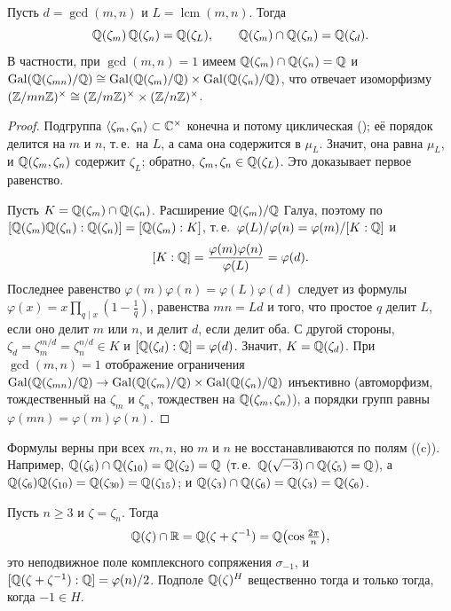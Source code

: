 \begin{proposition}
Пусть $d=\gcd(m,n)$ и $L=\operatorname{lcm}(m,n)$. Тогда
\[
\mathbb Q(\zeta_m)\,\mathbb Q(\zeta_n)=\mathbb Q(\zeta_L),\qquad \mathbb Q(\zeta_m)\cap\mathbb Q(\zeta_n)=\mathbb Q(\zeta_d).
\]
В частности, при $\gcd(m,n)=1$ имеем $\mathbb Q(\zeta_m)\cap\mathbb Q(\zeta_n)=\mathbb Q$ и $\operatorname{Gal}(\mathbb Q(\zeta_{mn})/\mathbb Q)\cong
\operatorname{Gal}(\mathbb Q(\zeta_m)/\mathbb Q)\times\operatorname{Gal}(\mathbb Q(\zeta_n)/\mathbb Q)$, что отвечает изоморфизму $(\mathbb Z/mn\mathbb Z)^\times\cong(\mathbb Z/m\mathbb Z)^\times\times(\mathbb Z/n\mathbb Z)^\times$.
\end{proposition}

\begin{proof}
Подгруппа $\langle\zeta_m,\zeta_n\rangle\subset\mathbb C^\times$ конечна и потому циклическая (); её порядок делится на $m$ и
$n$, т.\,е.\ на $L$, а сама она содержится в $\mu_L$. Значит, она равна $\mu_L$, и $\mathbb Q(\zeta_m,\zeta_n)$ содержит $\zeta_L$; обратно,
$\zeta_m,\zeta_n\in\mathbb Q(\zeta_L)$. Это доказывает первое равенство.

Пусть $K=\mathbb Q(\zeta_m)\cap\mathbb Q(\zeta_n)$. Расширение $\mathbb Q(\zeta_m)/\mathbb Q$ Галуа, поэтому по 
$[\mathbb Q(\zeta_m)\mathbb Q(\zeta_n):\mathbb Q(\zeta_n)]=[\mathbb Q(\zeta_m):K]$, т.\,е.\ $\varphi(L)/\varphi(n)=\varphi(m)/[K:\mathbb Q]$ и
\[
[K:\mathbb Q]=\frac{\varphi(m)\varphi(n)}{\varphi(L)}=\varphi(d).
\]
Последнее равенство $\varphi(m)\varphi(n)=\varphi(L)\varphi(d)$ следует из формулы $\varphi(x)=x\prod_{q\mid x}(1-\frac1q)$,
равенства $mn=Ld$ и того, что простое $q$ делит $L$, если оно делит $m$ или $n$, и делит $d$, если делит оба. С другой
стороны, $\zeta_d=\zeta_m^{m/d}=\zeta_n^{n/d}\in K$ и $[\mathbb Q(\zeta_d):\mathbb Q]=\varphi(d)$. Значит, $K=\mathbb Q(\zeta_d)$. При $\gcd(m,n)=1$
отображение ограничения $\operatorname{Gal}(\mathbb Q(\zeta_{mn})/\mathbb Q)\to\operatorname{Gal}(\mathbb Q(\zeta_m)/\mathbb Q)\times\operatorname{Gal}(\mathbb Q(\zeta_n)/\mathbb Q)$ инъективно (автоморфизм,
тождественный на $\zeta_m$ и $\zeta_n$, тождествен на $\mathbb Q(\zeta_m,\zeta_n)$), а порядки групп равны $\varphi(mn)=\varphi(m)\varphi(n)$.
\end{proof}

Формулы верны при всех $m,n$, но $m$ и $n$ не восстанавливаются по полям ((c)). Например,
$\mathbb Q(\zeta_6)\cap\mathbb Q(\zeta_{10})=\mathbb Q(\zeta_2)=\mathbb Q$ (т.\,е.\ $\mathbb Q(\sqrt{-3})\cap\mathbb Q(\zeta_5)=\mathbb Q$), а
$\mathbb Q(\zeta_6)\mathbb Q(\zeta_{10})=\mathbb Q(\zeta_{30})=\mathbb Q(\zeta_{15})$; и $\mathbb Q(\zeta_3)\cap\mathbb Q(\zeta_6)=\mathbb Q(\zeta_3)=\mathbb Q(\zeta_6)$.

\begin{proposition}
Пусть $n\ge3$ и $\zeta=\zeta_n$. Тогда
\[
\mathbb Q(\zeta)\cap\mathbb R=\mathbb Q(\zeta+\zeta^{-1})=\mathbb Q\bigl(\cos\tfrac{2\pi}n\bigr),
\]
это неподвижное поле комплексного сопряжения $\sigma_{-1}$, и $[\mathbb Q(\zeta+\zeta^{-1}):\mathbb Q]=\varphi(n)/2$. Подполе
$\mathbb Q(\zeta)^H$ вещественно тогда и только тогда, когда $-1\in H$.
\end{proposition}

